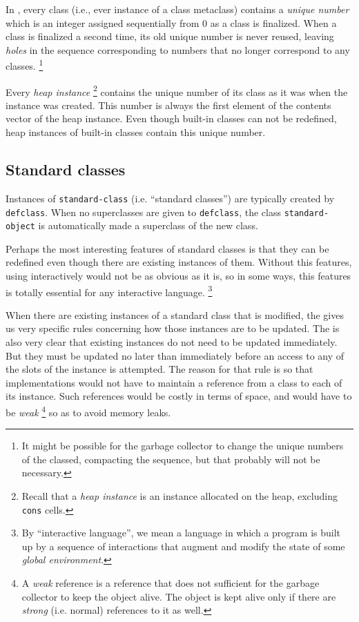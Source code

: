 In \sysname{}, every class (i.e., ever instance of a class metaclass)
contains a \emph{unique number} which is an integer assigned
sequentially from $0$ as a class is finalized.  When a class is
finalized a second time, its old unique number is never reused,
leaving \emph{holes} in the sequence corresponding to numbers that no
longer correspond to any classes.%
\footnote{It might be possible for the garbage collector to change the
  unique numbers of the classed, compacting the sequence, but that
  probably will not be necessary.}

Every \emph{heap instance}%
\footnote{Recall that a \emph{heap instance} is an instance allocated
  on the heap, excluding \texttt{cons} cells.}
contains the unique number of its class as it was when the instance
was created.  This number is always the first element of the contents
vector of the heap instance.  Even though built-in classes can not be
redefined, heap instances of built-in classes contain this unique
number. 

\subsection{Standard classes}
\label{object-system-standard-classes}

Instances of \texttt{standard-class} (i.e. ``standard classes'') are
typically created by \texttt{defclass}.  When no superclasses are
given to \texttt{defclass}, the class \texttt{standard-object} is
automatically made a superclass of the new class.  

Perhaps the most interesting features of standard classes is that they
can be redefined even though there are existing instances of them.
Without this features, using \cl{} interactively would not be as
obvious as it is, so in some ways, this features is totally essential
for any interactive language.%
\footnote{By ``interactive language'', we mean a language in which a
  program is built up by a sequence of interactions that augment and
  modify the state of some \emph{global environment}.}

When there are existing instances of a standard class that is
modified, the \hs{} gives us very specific rules concerning how
those instances are to be updated.  The \hs{} is also very clear
that existing instances do not need to be updated immediately.  But
they must be updated no later than immediately before an access to any
of the slots of the instance is attempted.   The reason for that rule
is so that implementations would not have to maintain a reference from
a class to each of its instance.  Such references would be costly in
terms of space, and would have to be \emph{weak}%
\footnote{A \emph{weak} reference is a reference that does not
  sufficient for the garbage collector to keep the object alive.  The
  object is kept alive only if there are \emph{strong} (i.e. normal)
  references to it as well.}
so as to avoid memory leaks. 

